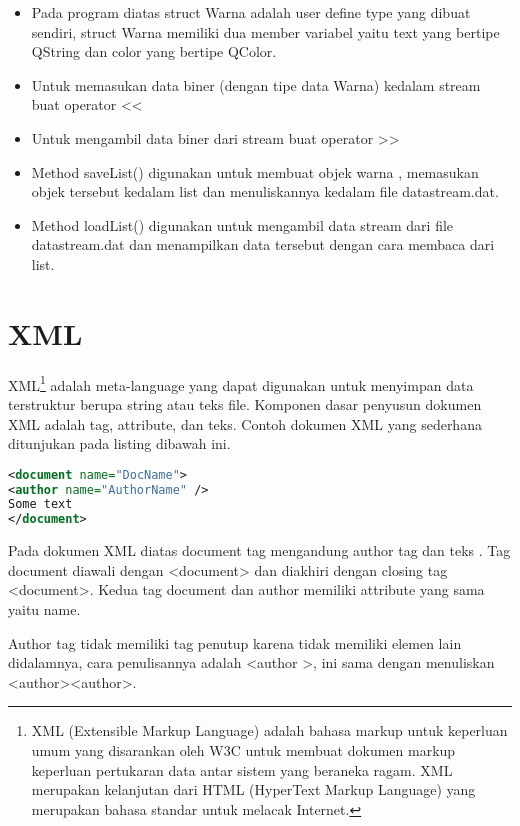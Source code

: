\begin{itemize}

\item
  Pada program diatas struct Warna adalah user define type yang dibuat
  sendiri, struct Warna memiliki dua member variabel yaitu text yang
  bertipe QString dan color yang bertipe QColor.
\item
  Untuk memasukan data biner (dengan tipe data Warna) kedalam stream
  buat operator \textless{}\textless{}
\item
  Untuk mengambil data biner dari stream buat operator
  \textgreater{}\textgreater{}
\item
  Method saveList() digunakan untuk membuat objek warna , memasukan
  objek tersebut kedalam list dan menuliskannya kedalam file
  datastream.dat.
\item
  Method loadList() digunakan untuk mengambil data stream dari file
  datastream.dat dan menampilkan data tersebut dengan cara membaca dari
  list.
\end{itemize}

\section{XML}\label{xml}

XML\footnote{XML (Extensible Markup Language) adalah bahasa markup untuk keperluan umum yang disarankan oleh W3C untuk membuat dokumen markup keperluan pertukaran data antar sistem yang beraneka ragam. XML merupakan kelanjutan dari HTML (HyperText Markup Language) yang merupakan bahasa standar untuk melacak Internet.} adalah meta-language yang dapat digunakan untuk menyimpan data
terstruktur berupa string atau teks file. Komponen dasar penyusun
dokumen XML adalah tag, attribute, dan teks. Contoh dokumen XML yang
sederhana ditunjukan pada listing dibawah ini.

\begin{lstlisting}[language=xml]
<document name="DocName">
<author name="AuthorName" />
Some text
</document>
\end{lstlisting}

Pada dokumen XML diatas document tag mengandung author tag dan teks . Tag document diawali
dengan \textless{}document\textgreater{} dan diakhiri dengan closing tag 
\textless{}\textfractionsolidus{}document\textgreater{}. Kedua tag document dan author
memiliki attribute yang sama yaitu name.

Author tag tidak memiliki tag penutup karena tidak memiliki elemen lain didalamnya, cara penulisannya
adalah \textless{}author \textfractionsolidus{}\textgreater{}, ini sama dengan menuliskan 
\textless{}author\textgreater{}\textless{}\textfractionsolidus{}author\textgreater{}.

